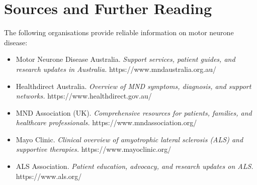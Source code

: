 \section*{Sources and Further Reading}
The following organisations provide reliable information on motor neurone disease:

\begin{itemize}
    \item Motor Neurone Disease Australia. \textit{Support services, patient guides, and research updates in Australia.} https://www.mndaustralia.org.au/
    \item Healthdirect Australia. \textit{Overview of MND symptoms, diagnosis, and support networks.} https://www.healthdirect.gov.au/
    \item MND Association (UK). \textit{Comprehensive resources for patients, families, and healthcare professionals.} https://www.mndassociation.org/
    \item Mayo Clinic. \textit{Clinical overview of amyotrophic lateral sclerosis (ALS) and supportive therapies.} https://www.mayoclinic.org/
    \item ALS Association. \textit{Patient education, advocacy, and research updates on ALS.} https://www.als.org/
\end{itemize}

